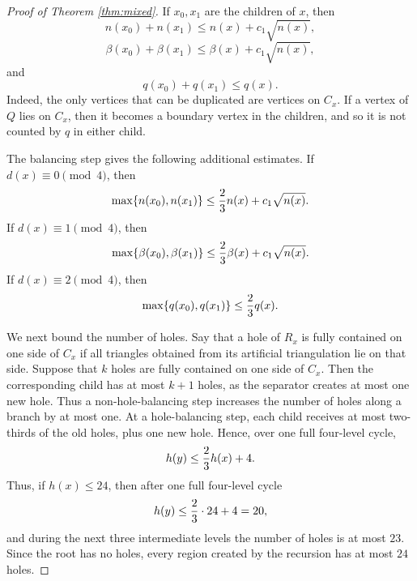 \documentclass[11pt]{article}
\theoremstyle{plain}
\theoremstyle{definition}
\theoremstyle{remark}
\begin{document}
\begin{proof}[Proof of Theorem \ref{thm:mixed}]
If \(x_0,x_1\) are the children of \(x\), then
\begin{equation}\label{eq:sum-n-beta-q}
n(x_0)+n(x_1)\le n(x)+c_1\sqrt{n(x)},
\end{equation}
\begin{equation}\label{eq:sum-beta}
\beta(x_0)+\beta(x_1)\le \beta(x)+c_1\sqrt{n(x)},
\end{equation}
and
\begin{equation}\label{eq:sum-q}
q(x_0)+q(x_1)\le q(x).
\end{equation}
Indeed, the only vertices that can be duplicated are vertices on \(C_x\). If a vertex of \(Q\) lies on \(C_x\), then it becomes a boundary vertex in the children, and so it is not counted by \(q\) in either child.

The balancing step gives the following additional estimates. If \(d(x)\equiv 0\pmod 4\), then
\begin{equation}\label{eq:n-balanced}
\max\{n(x_0),n(x_1)\}\le {2\over 3}n(x)+c_1\sqrt{n(x)}.
\end{equation}
If \(d(x)\equiv 1\pmod 4\), then
\begin{equation}\label{eq:beta-balanced}
\max\{\beta(x_0),\beta(x_1)\}\le {2\over 3}\beta(x)+c_1\sqrt{n(x)}.
\end{equation}
If \(d(x)\equiv 2\pmod 4\), then
\begin{equation}\label{eq:q-balanced}
\max\{q(x_0),q(x_1)\}\le {2\over 3}q(x).
\end{equation}

We next bound the number of holes. Say that a hole of \(R_x\) is fully contained on one side of \(C_x\) if all triangles obtained from its artificial triangulation lie on that side. Suppose that \(k\) holes are fully contained on one side of \(C_x\). Then the corresponding child has at most \(k+1\) holes, as the separator creates at most one new hole. Thus a non-hole-balancing step increases the number of holes along a branch by at most one. At a hole-balancing step, each child receives at most two-thirds of the old holes, plus one new hole. Hence, over one full four-level cycle,
\[
h(y)\le {2\over 3}h(x)+4.
\]
Thus, if \(h(x)\le 24\), then after one full four-level cycle
\[
h(y)\le {2\over 3}\cdot 24+4=20,
\]
and during the next three intermediate levels the number of holes is at most \(23\). Since the root has no holes, every region created by the recursion has at most \(24\) holes.




\medskip




\end{proof}
\end{document}
